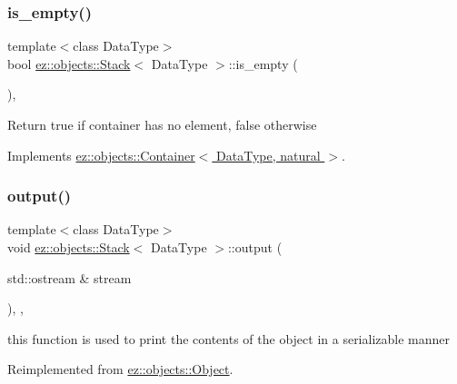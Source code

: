 \subsubsection{\texorpdfstring{is\+\_\+empty()}{is\_empty()}}
{\footnotesize\ttfamily template$<$class Data\+Type$>$ \\
bool \hyperlink{classez_1_1objects_1_1Stack}{ez\+::objects\+::\+Stack}$<$ Data\+Type $>$\+::is\+\_\+empty (\begin{DoxyParamCaption}{ }\end{DoxyParamCaption})\hspace{0.3cm}{\ttfamily [inline]}, {\ttfamily [virtual]}}

Return true if container has no element, false otherwise 

Implements \hyperlink{classez_1_1objects_1_1Container_a205eb4f8a4fe967d425fdf04e5db5f93}{ez\+::objects\+::\+Container$<$ Data\+Type, natural $>$}.

\mbox{\label{classez_1_1objects_1_1Stack_a5df9f4c84fff1e025c094219765d0032}} 
\subsubsection{\texorpdfstring{output()}{output()}}
{\footnotesize\ttfamily template$<$class Data\+Type$>$ \\
void \hyperlink{classez_1_1objects_1_1Stack}{ez\+::objects\+::\+Stack}$<$ Data\+Type $>$\+::output (\begin{DoxyParamCaption}\item[{std\+::ostream \&}]{stream }\end{DoxyParamCaption})\hspace{0.3cm}{\ttfamily [inline]}, {\ttfamily [override]}, {\ttfamily [virtual]}}

this function is used to print the contents of the object in a serializable manner 

Reimplemented from \hyperlink{classez_1_1objects_1_1Object_a0fdfe18e6c35d6b0d7e7a01265aded15}{ez\+::objects\+::\+Object}.

\mbox{\label{classez_1_1objects_1_1Stack_a99dd22aaeedd73fb044aaf22c3cf12ac}} 
